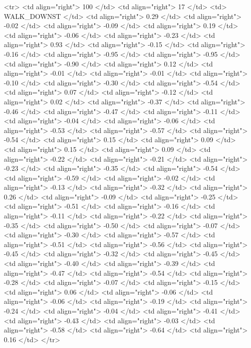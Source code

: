   <tr> <td align="right"> 100 </td> <td align="right">  17 </td> <td> WALK_DOWNST </td> <td align="right"> 0.29 </td> <td align="right"> -0.02 </td> <td align="right"> -0.09 </td> <td align="right"> 0.19 </td> <td align="right"> -0.06 </td> <td align="right"> -0.23 </td> <td align="right"> 0.93 </td> <td align="right"> -0.15 </td> <td align="right"> -0.16 </td> <td align="right"> -0.95 </td> <td align="right"> -0.95 </td> <td align="right"> -0.90 </td> <td align="right"> 0.12 </td> <td align="right"> -0.01 </td> <td align="right"> -0.01 </td> <td align="right"> -0.10 </td> <td align="right"> -0.30 </td> <td align="right"> -0.54 </td> <td align="right"> 0.07 </td> <td align="right"> -0.12 </td> <td align="right"> 0.02 </td> <td align="right"> -0.37 </td> <td align="right"> -0.46 </td> <td align="right"> -0.47 </td> <td align="right"> -0.11 </td> <td align="right"> -0.04 </td> <td align="right"> -0.06 </td> <td align="right"> -0.53 </td> <td align="right"> -0.57 </td> <td align="right"> -0.54 </td> <td align="right"> 0.15 </td> <td align="right"> 0.09 </td> <td align="right"> 0.15 </td> <td align="right"> 0.09 </td> <td align="right"> -0.22 </td> <td align="right"> -0.21 </td> <td align="right"> -0.23 </td> <td align="right"> -0.35 </td> <td align="right"> -0.54 </td> <td align="right"> -0.59 </td> <td align="right"> -0.02 </td> <td align="right"> -0.13 </td> <td align="right"> -0.32 </td> <td align="right"> 0.26 </td> <td align="right"> -0.09 </td> <td align="right"> -0.25 </td> <td align="right"> -0.51 </td> <td align="right"> -0.16 </td> <td align="right"> -0.11 </td> <td align="right"> -0.22 </td> <td align="right"> -0.35 </td> <td align="right"> -0.50 </td> <td align="right"> -0.07 </td> <td align="right"> -0.30 </td> <td align="right"> -0.57 </td> <td align="right"> -0.51 </td> <td align="right"> -0.56 </td> <td align="right"> -0.45 </td> <td align="right"> -0.32 </td> <td align="right"> -0.45 </td> <td align="right"> -0.40 </td> <td align="right"> -0.39 </td> <td align="right"> -0.47 </td> <td align="right"> -0.54 </td> <td align="right"> -0.28 </td> <td align="right"> -0.07 </td> <td align="right"> -0.15 </td> <td align="right"> 0.06 </td> <td align="right"> -0.06 </td> <td align="right"> -0.06 </td> <td align="right"> -0.19 </td> <td align="right"> -0.24 </td> <td align="right"> -0.04 </td> <td align="right"> -0.41 </td> <td align="right"> -0.43 </td> <td align="right"> -0.03 </td> <td align="right"> -0.58 </td> <td align="right"> -0.64 </td> <td align="right"> 0.16 </td> </tr>
